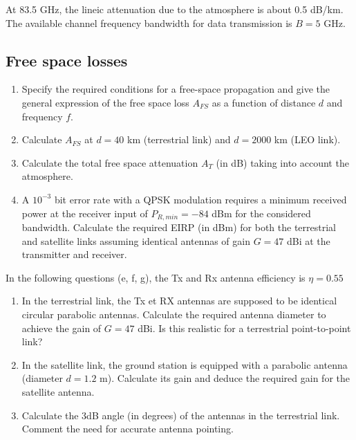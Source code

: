 \documentclass[a4paper,11pt]{article}
\begin{document}
At 83.5 GHz, the lineic attenuation due to the atmosphere is about 0.5 dB/km. The available channel frequency bandwidth for data transmission is $B = 5$ GHz.

\subsection{Free space losses}

\begin{enumerate}[label=\alph*.]
    \item Specify the required conditions for a free-space propagation and give the general expression of the free space loss $A_{FS}$ as a function of distance $d$ and frequency $f$.
    
    \item Calculate $A_{FS}$ at $d = 40$ km (terrestrial link) and $d = 2000$ km (LEO link).
    
    \item Calculate the total free space attenuation $A_T$ (in dB) taking into account the atmosphere.
    
    \item A $10^{-3}$ bit error rate with a QPSK modulation requires a minimum received power at the receiver input of $P_{R,min} = -84$ dBm for the considered bandwidth. Calculate the required EIRP (in dBm) for both the terrestrial and satellite links assuming identical antennas of gain $G = 47$ dBi at the transmitter and receiver.
\end{enumerate}

In the following questions (e, f, g), the Tx and Rx antenna efficiency is $\eta = 0.55$

\begin{enumerate}[label=\alph*., start=5]
    \item In the terrestrial link, the Tx et RX antennas are supposed to be identical circular parabolic antennas. Calculate the required antenna diameter to achieve the gain of $G = 47$ dBi. Is this realistic for a terrestrial point-to-point link?
    
    \item In the satellite link, the ground station is equipped with a parabolic antenna (diameter $d = 1.2$ m). Calculate its gain and deduce the required gain for the satellite antenna.
    
    \item Calculate the 3dB angle (in degrees) of the antennas in the terrestrial link. Comment the need for accurate antenna pointing.
\end{enumerate}
\end{document}
